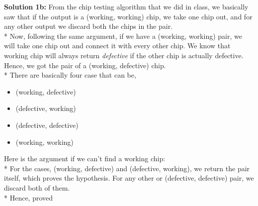 \documentclass{article}
\theoremstyle{definition}
\begin{document}
\textbf{Solution 1b:} From the chip testing algorithm that we did in class, we basically saw that if the output is a (working, working)  chip, we take one chip out, and for any other output we discard both the chips in the pair. \bigskip\\*
 Now, following the same argument, if we have a (working, working) pair, we will take one chip out and connect it with every other chip. We know that working chip will always return {\textit{defective}} if the other chip is actually defective. Hence, we got the pair of a (working, defective) chip. \bigskip \\*
There are basically four case that can be,
	\begin{itemize}
		\item (working, defective)
		\item (defective, working)
		\item (defective, defective)
		\item (working, working)
	\end{itemize}
Here is the argument if we can't find a working chip:\\*
For the cases, (working, defective) and (defective, working), we return the pair itself, which proves the hypothesis. For any other or (defective, defective) pair, we discard both of them. \bigskip\\*
Hence, proved
\end{document}
